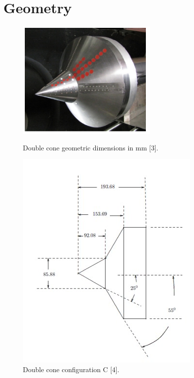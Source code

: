 \section{Geometry}
\label{sec:background}


\begin{figure}[ht]
\centering
\begin{minipage}{.5\textwidth}
  \centering
  \includegraphics[width=0.9\linewidth]{images/doublecone.png}
  \caption{ Double cone geometric dimensions in mm [3].}
  \label{fig:ExperimentCone}
\end{minipage}%
\begin{minipage}{.5\textwidth}
  \centering
 \includegraphics[width =0.9\linewidth]{images/model_dimensions.jpg}
  \caption{ Double cone configuration C [4].}
  \label{fig:ModelDimensions}
\end{minipage}
\end{figure}

